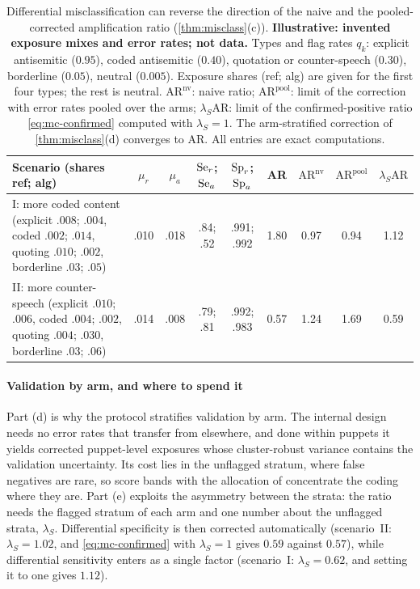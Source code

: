 \begin{table}[tbp]
\centering
\caption{Differential misclassification can reverse the direction of the naive and the pooled-corrected amplification ratio (\cref{thm:misclass}(c)). \textbf{Illustrative: invented exposure mixes and error rates; not data.} Types and flag rates $q_k$: explicit antisemitic ($0.95$), coded antisemitic ($0.40$), quotation or counter-speech ($0.30$), borderline ($0.05$), neutral ($0.005$). Exposure shares (ref; alg) are given for the first four types; the rest is neutral. $\mathrm{AR}^{\mathrm{nv}}$: naive ratio; $\mathrm{AR}^{\mathrm{pool}}$: limit of the correction with error rates pooled over the arms; $\lambda_S\mathrm{AR}$: limit of the confirmed-positive ratio \eqref{eq:mc-confirmed} computed with $\lambda_S=1$. The arm-stratified correction of \cref{thm:misclass}(d) converges to AR. All entries are exact computations.}\label{tab:mc-signflip}
\footnotesize
\setlength{\tabcolsep}{4pt}
\begin{tabularx}{\textwidth}{@{}>{\raggedright\arraybackslash}Xcccccccc@{}}
\toprule
Scenario (shares ref; alg) & $\mu_r$ & $\mu_a$ & $\mathrm{Se}_r$; $\mathrm{Se}_a$ & $\mathrm{Sp}_r$; $\mathrm{Sp}_a$ & AR & $\mathrm{AR}^{\mathrm{nv}}$ & $\mathrm{AR}^{\mathrm{pool}}$ & $\lambda_S\mathrm{AR}$ \\
\midrule
I: more coded content (explicit $.008$; $.004$, coded $.002$; $.014$, quoting $.010$; $.002$, borderline $.03$; $.05$) & .010 & .018 & .84; .52 & .991; .992 & 1.80 & 0.97 & 0.94 & 1.12 \\
II: more counter-speech (explicit $.010$; $.006$, coded $.004$; $.002$, quoting $.004$; $.030$, borderline $.03$; $.06$) & .014 & .008 & .79; .81 & .992; .983 & 0.57 & 1.24 & 1.69 & 0.59 \\
\bottomrule
\end{tabularx}
\end{table}

\paragraph{Validation by arm, and where to spend it}
Part (d) is why the protocol stratifies validation by arm. The internal design needs no error rates that transfer from elsewhere, and done within puppets it yields corrected puppet-level exposures whose cluster-robust variance contains the validation uncertainty. Its cost lies in the unflagged stratum, where false negatives are rare, so score bands with the allocation of \citet{neyman1934} concentrate the coding where they are. Part (e) exploits the asymmetry between the strata: the ratio needs the flagged stratum of each arm and one number about the unflagged strata, $\lambda_S$. Differential specificity is then corrected automatically (scenario~II: $\lambda_S=1.02$, and \eqref{eq:mc-confirmed} with $\lambda_S=1$ gives $0.59$ against $0.57$), while differential sensitivity enters as a single factor (scenario~I: $\lambda_S=0.62$, and setting it to one gives $1.12$).

